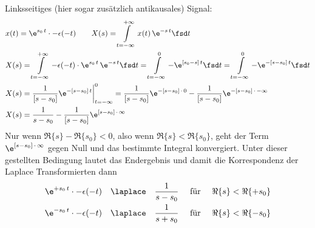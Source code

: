 \begin{ExCalc}
Linksseitiges (hier sogar zusätzlich antikausales) Signal:
\begin{align}
&x(t) = \e^{s_0 \, t} \cdot - \epsilon(-t) \qquad
X(s) = \int\limits_{t = -\infty}^{+\infty} x(t) \, \e^{-s\,t}  \fsd t\\
&X(s) = \int\limits_{t = -\infty}^{+\infty} -\epsilon(-t) \cdot \e^{s_0 \, t} \, \e^{-s\,t}  \fsd t
= \int\limits_{t = -\infty}^{0} -\e^{[s_0-s]\,t} \fsd t = \int\limits_{t = -\infty}^{0} -\e^{-[s-s_0]\,t} \fsd t\\
&X(s) = \frac{1}{[s-s_0]}\e^{-[s-s_0]\,t}\bigg|_{t=-\infty}^{0}=
\frac{1}{[s-s_0]}\e^{-[s-s_0]\,\cdot\, 0} - \frac{1}{[s-s_0]}\e^{-[s-s_0]\,\cdot\, -\infty}\\
&X(s) = \frac{1}{s-s_0} - \frac{1}{[s-s_0]}\e^{[s-s_0]\,\cdot\, \infty}
\end{align}
Nur wenn $\Re\{s\}-\Re\{s_0\} < 0$, also wenn $\Re\{s\}<\Re\{s_0\}$, geht
der Term $\e^{[s-s_0]\,\cdot\,\infty }$ gegen Null und das bestimmte Integral
konvergiert.
Unter dieser gestellten Bedingung lautet das Endergebnis und damit die
Korrespondenz der Laplace Transformierten dann
\begin{align}
\e^{+s_0 \, t} \cdot -\epsilon(-t) \quad \laplace \quad \frac{1}{s-s_0} \quad\text{ für } \quad\Re\{s\} < \Re\{+s_0\}\\
\e^{-s_0 \, t} \cdot -\epsilon(-t) \quad \laplace \quad \frac{1}{s+s_0} \quad\text{ für } \quad\Re\{s\} < \Re\{-s_0\}
\end{align}
\end{ExCalc}
